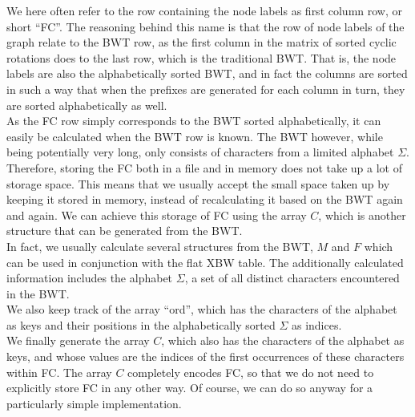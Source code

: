 \documentclass[a4paper,12pt,twoside,BCOR=10mm]{scrbook}
\begin{document}
We here often refer to the row containing the node labels as first column row, or short “FC”. 
The reasoning behind this name is that the row of node labels of the graph relate to the BWT row, 
as the first column in the matrix of sorted cyclic rotations does to the last row, which is the traditional BWT. 
That is, the node labels are also the alphabetically sorted BWT, and in fact the columns are sorted in such a 
way that when the prefixes are generated for each column in turn, they are sorted alphabetically as well. \\
As the FC row simply corresponds to the BWT sorted alphabetically, it can easily be calculated 
when the BWT row is known. The BWT however, while being potentially very 
long, only consists of characters from a limited alphabet $ \Sigma $. 
Therefore, storing the FC both in a file and in memory does not take up a lot of storage space. 
This means that we usually accept the small space taken up by keeping it stored in memory, 
instead of recalculating it based on the BWT again and again. 
We can achieve this storage of FC using the array $ C $, which is another structure that can be generated 
from the BWT. \\
In fact, we usually calculate several structures from the BWT, $ M $ and $ F $ which 
can be used in conjunction with the flat XBW table. 
The additionally calculated information includes 
the alphabet $ \Sigma $, a set of all distinct characters encountered in the BWT. \\
We also keep track of the array “ord”, which has the characters of the alphabet as keys and their 
positions in the alphabetically sorted $ \Sigma $ as indices. \\
We finally generate the array $ C $, which also has the characters of the alphabet as keys, 
and whose values are the indices of the first occurrences of these characters within FC. 
The array $ C $ completely encodes FC, so that we do not need to explicitly store FC in any other way. 
Of course, we can do so anyway for a particularly simple implementation.
\end{document}

